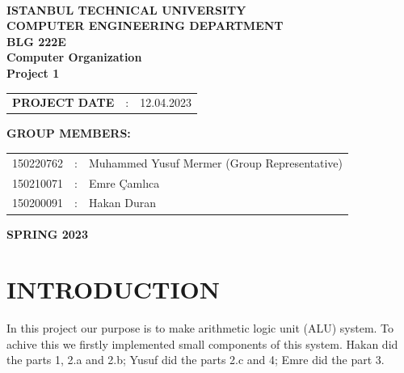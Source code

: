 \documentclass[pdftex,12pt,a4paper]{article}
\begin{document}
\begin{titlepage}
\begin{center}
\textbf{}\\
\textbf{\Large{ISTANBUL TECHNICAL UNIVERSITY}}\\
\vspace{0.5cm}
\textbf{\Large{COMPUTER ENGINEERING DEPARTMENT}}\\
\vspace{2cm}
\textbf{\Large{BLG 222E\\ Computer Organization \\ Project 1}}\\
\vspace{2.8cm}
\begin{table}[ht]
\centering
\Large{
\begin{tabular}{lcl}
\textbf{PROJECT DATE}  & : & 12.04.2023\\
\end{tabular}}
\end{table}
\vspace{1cm}
\textbf{\Large{GROUP MEMBERS:}}\\
\begin{table}[ht]
\centering
\Large{
\begin{tabular}{rcl}
150220762  & : & Muhammed Yusuf Mermer (Group Representative)  \\
150210071  & : & Emre Çamlıca \\
150200091  & : & Hakan Duran \\
\end{tabular}}
\end{table}
\vspace{2.8cm}
\textbf{\Large{SPRING 2023}}

\end{center}

\end{titlepage}

\thispagestyle{empty}
\setcounter{tocdepth}{4}
\tableofcontents
\clearpage

\setcounter{page}{1}
\section{INTRODUCTION}
In this project our purpose is to make arithmetic logic unit (ALU) system. To achive 
this we firstly implemented small components of this system. Hakan did the parts 1, 2.a and 2.b; 
Yusuf did the parts 2.c and 4; Emre did the part 3.
\end{document}
